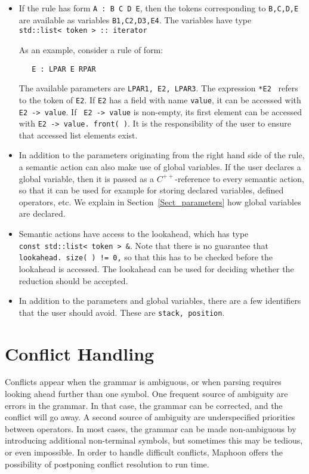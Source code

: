 \documentclass{article}
\begin{document}
\begin{itemize}
\item
   If the rule has form \verb+A : B C D E+, then the
   tokens corresponding to \verb+B,C,D,E+ are available as
   variables \verb+B1,C2,D3,E4+. The variables have type \\
   \verb+std::list< token > :: iterator+
  
   As an example, consider a rule of form: 
\begin{verbatim}
   E : LPAR E RPAR 
\end{verbatim}
   The available parameters are \verb+LPAR1, E2, LPAR3+.
   The expression \verb+*E2 + refers to the token of
   \verb+E2+. If \verb+E2+ has a field with name
   \verb+value+, it can be accessed with
   \verb+E2 -> value+. If \verb+ E2 -> value+ is non-empty,
   its first element can be accessed with
   \verb+E2 -> value. front( )+.
   It is the responsibility of the user to ensure that
   accessed list elements exist.  
\item
   In addition to the parameters originating from the right hand
   side of the rule, a semantic action can also make use of
   global variables. If the user declares a global variable,
   then it is passed as a $ C^{++} $-reference to 
   every semantic action, so that it can be used for example for 
   storing declared variables, defined operators, etc.
   We explain in Section~\ref{Sect_parameters} how global variables are 
   declared. 
\item
   Semantic actions have access to the lookahead, which has type \\
   \verb+const std::list< token > &+. 
   Note that there is no guarantee that 
   \verb+lookahead. size( ) != 0,+ so that this has to be checked
   before the lookahead is accessed. 
   The lookahead can be used for deciding whether 
   the reduction should be accepted. 

\item
   In addition to the parameters and global variables, there
   are a few identifiers that the user should avoid.
   These are \verb+stack, position+.
\end{itemize}
   
\section{Conflict Handling}

Conflicts appear when the grammar is ambiguous,
or when parsing requires looking ahead further than one symbol.
One frequent source of ambiguity are errors in the grammar.
In that case, the grammar can be corrected,
and the conflict will go away. 
A second source of ambiguity are underspecified priorities
between operators. In most cases, the grammar can
be made non-ambiguous by introducing additional
non-terminal symbols, but sometimes 
this may be tedious,
or even impossible. 
In order to handle difficult conflicts, Maphoon offers the possibility
of postponing conflict resolution to run time. 
\end{document}
